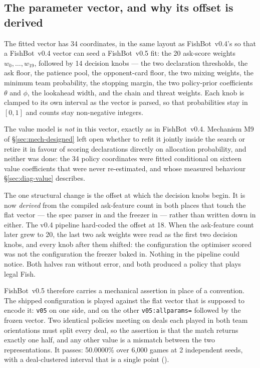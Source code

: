 \documentclass[11pt]{article}
\theoremstyle{definition}
\DeclareRobustCommand{\vfive}{\texorpdfstring{\mbox{FishBot v0.5}}{FishBot v0.5}}
\DeclareRobustCommand{\vfour}{\texorpdfstring{\mbox{FishBot v0.4}}{FishBot v0.4}}
\providecommand{\numFitDims}{34}
\providecommand{\numFitAskFeats}{20}
\providecommand{\numFitKnobs}{14}
\providecommand{\numAliasOffset}{18}
\providecommand{\numRoundTrip}{50.0000}
\providecommand{\numRoundTripPass}{passes}
\providecommand{\numRoundTripSeeds}{2}
\providecommand{\numRoundTripGames}{6{,}000}
\begin{document}
\subsection{The parameter vector, and why its offset is derived}
\label{sec:fit-vector}

The fitted vector has \numFitDims{} coordinates, in the same layout as
\vfour{}'s so that a \vfour{} vector can seed a \vfive{} fit: the
\numFitAskFeats{} ask-score weights $w_0,\dots,w_{19}$, followed by
\numFitKnobs{} decision knobs --- the two declaration thresholds, the ask floor,
the patience pool, the opponent-card floor, the two mixing weights, the minimum
team probability, the stopping margin, the two policy-prior coefficients $\theta$
and $\phi$, the lookahead width, and the chain and threat weights. Each knob is
clamped to its own interval as the vector is parsed, so that probabilities stay
in $[0,1]$ and counts stay non-negative integers.

The value model is \emph{not} in this vector, exactly as in \vfour{}. Mechanism
M9 of \S\ref{sec:mech-designed} left open whether to refit it jointly inside the
search or retire it in favour of scoring declarations directly on allocation
probability, and neither was done: the \numFitDims{} policy coordinates were
fitted conditional on sixteen value coefficients that were never re-estimated,
and whose measured behaviour \S\ref{sec:diag-value} describes.

The one structural change is the offset at which the decision knobs begin. It is
now \emph{derived} from the compiled ask-feature count in both places that touch
the flat vector --- the spec parser in  and the
freezer in  --- rather than written down in
either. The v0.4 pipeline hard-coded the offset at \numAliasOffset{}. When the
ask-feature count later grew to \numFitAskFeats{}, the last two ask weights were
read as the first two decision knobs, and every knob after them shifted: the
configuration the optimiser scored was not the configuration the freezer baked
in. Nothing in the pipeline could notice. Both halves ran without error, and both
produced a policy that plays legal Fish.

\vfive{} therefore carries a mechanical assertion in place of a convention. The
shipped configuration is played against the flat vector that is supposed to
encode it: \texttt{v05} on one side, and on the other \texttt{v05:allparams=}
followed by the frozen vector. Two identical policies meeting on deals each played in
both team orientations must split every deal, so the assertion is that the match
returns exactly one half, and any other value is a mismatch between the two
representations. It \numRoundTripPass{}: \numRoundTrip\% over
\numRoundTripGames{} games at \numRoundTripSeeds{} independent seeds, with a
deal-clustered interval that is a single point
().
\end{document}
